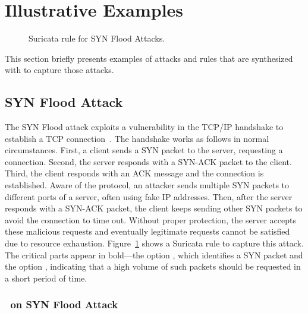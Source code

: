 \documentclass[runningheads]{llncs}
\begin{document}


\section{Illustrative Examples}
\label{sec:suri-metas-coverage}

\begin{figure}[t]
  
  \caption{Suricata rule for SYN Flood Attacks.}
  \label{fig:synflood-example}
\end{figure}

This section briefly presents examples of attacks and rules that are
synthesized with \tname{} to capture those attacks.

\subsection{SYN Flood Attack}

The SYN Flood attack exploits a vulnerability in the TCP/IP handshake
to establish a TCP connection~\cite{cloudfare-synflood}. The handshake
works as follows in normal circumstances. First, a client sends a SYN
packet to the server, requesting a connection. Second, the server
responds with a SYN-ACK packet to the client. Third, the client
responds with an ACK message and the connection is established. Aware
of the protocol, an attacker sends multiple SYN packets to different
ports of a server, often using fake IP addresses. Then, after the
server responds with a SYN-ACK packet, the client keeps sending other
SYN packets to avoid the connection to time out. Without proper
protection, the server accepts these malicious requests and eventually
legitimate requests cannot be satisfied due to resource exhaustion.
Figure~\ref{fig:synflood-example} shows a Suricata rule to capture
this attack. The critical parts appear in bold---the option
, which identifies a SYN packet and the option
,
indicating that a high volume of such packets should be requested in a
short period of time.


\subsubsection{\tname\ on SYN Flood Attack}
\end{document}
